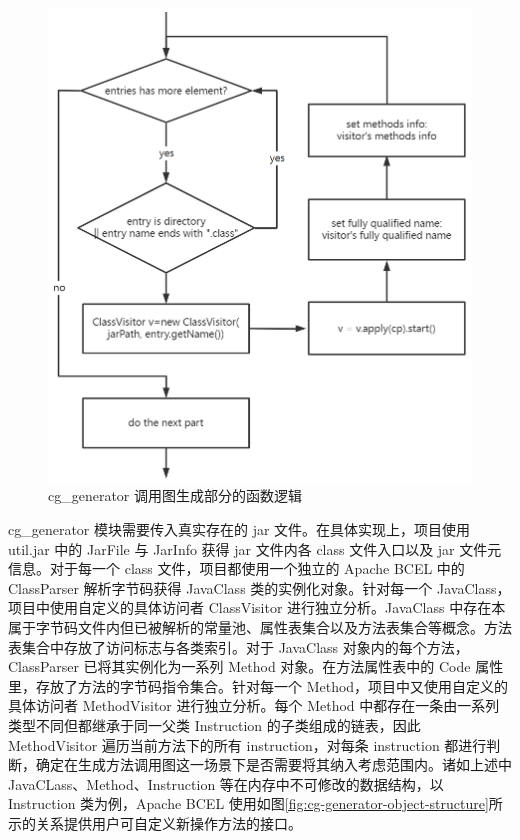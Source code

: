 \begin{figure}
    \centering
    \includegraphics[width=.9\textwidth]{figures/cg-generator-jcallgraph.png}
    \caption{cg\_generator 调用图生成部分的函数逻辑}
    \label{fig:cg-generator-jcallgraph}
\end{figure}

cg\_generator 模块需要传入真实存在的 jar 文件。在具体实现上，项目使用 util.jar 中的 JarFile 与 JarInfo 获得 jar 文件内各 class 文件入口以及 jar 文件元信息。对于每一个 class 文件，项目都使用一个独立的 Apache BCEL 中的 ClassParser 解析字节码获得 JavaClass 类的实例化对象。针对每一个 JavaClass，项目中使用自定义的具体访问者 ClassVisitor 进行独立分析。JavaClass 中存在本属于字节码文件内但已被解析的常量池、属性表集合以及方法表集合等概念。方法表集合中存放了访问标志与各类索引\cite{UNDERSTANDINGJVM}。对于 JavaClass 对象内的每个方法，ClassParser 已将其实例化为一系列 Method 对象。在方法属性表中的 Code 属性里，存放了方法的字节码指令集合\cite{UNDERSTANDINGJVM}。针对每一个 Method，项目中又使用自定义的具体访问者 MethodVisitor 进行独立分析。每个 Method 中都存在一条由一系列类型不同但都继承于同一父类 Instruction 的子类组成的链表，因此 MethodVisitor 遍历当前方法下的所有 instruction，对每条 instruction 都进行判断，确定在生成方法调用图这一场景下是否需要将其纳入考虑范围内。诸如上述中 JavaCLass、Method、Instruction 等在内存中不可修改的数据结构，以 Instruction 类为例，Apache BCEL 使用如图\ref{fig:cg-generator-object-structure}所示的关系提供用户可自定义新操作方法的接口。

